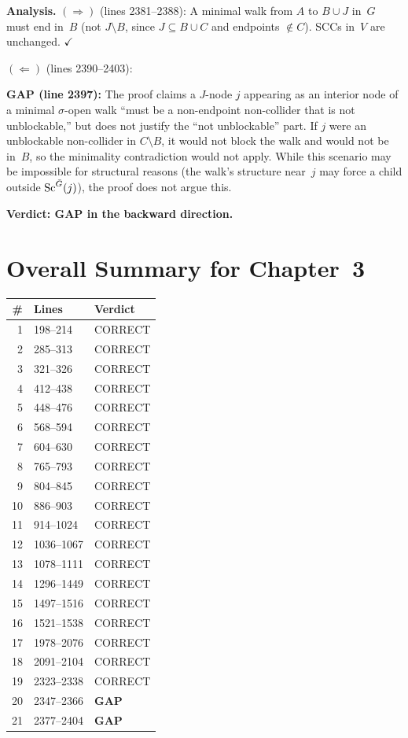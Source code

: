 \documentclass{article}
\begin{document}
\textbf{Analysis.}
$(\Rightarrow)$ (lines 2381--2388): A minimal walk from $A$ to $B\cup J$ in~$G$
must end in~$B$ (not $J\setminus B$, since $J\subseteq B\cup C$ and endpoints
$\notin C$).  SCCs in~$V$ are unchanged.  $\checkmark$

$(\Leftarrow)$ (lines 2390--2403):

\textbf{GAP (line 2397):}
The proof claims a $J$-node $j$ appearing as an interior node of a minimal
$\sigma$-open walk ``must be a non-endpoint non-collider that is not unblockable,''
but does not justify the ``not unblockable'' part.
If $j$ were an unblockable non-collider in $C\setminus B$, it would not block the
walk and would not be in~$B$, so the minimality contradiction would not apply.
While this scenario may be impossible for structural reasons
(the walk's structure near~$j$ may force a child outside $\mathrm{Sc}^{\bar G}(j)$),
the proof does not argue this.

\textbf{Verdict: GAP in the backward direction.}

\section*{Overall Summary for Chapter~3}

\begin{center}
\begin{tabular}{r|l|l}
\textbf{\#} & \textbf{Lines} & \textbf{Verdict} \\ \hline
1 & 198--214 & CORRECT \\
2 & 285--313 & CORRECT \\
3 & 321--326 & CORRECT \\
4 & 412--438 & CORRECT \\
5 & 448--476 & CORRECT \\
6 & 568--594 & CORRECT \\
7 & 604--630 & CORRECT \\
8 & 765--793 & CORRECT \\
9 & 804--845 & CORRECT \\
10 & 886--903 & CORRECT \\
11 & 914--1024 & CORRECT \\
12 & 1036--1067 & CORRECT \\
13 & 1078--1111 & CORRECT \\
14 & 1296--1449 & CORRECT \\
15 & 1497--1516 & CORRECT \\
16 & 1521--1538 & CORRECT \\
17 & 1978--2076 & CORRECT \\
18 & 2091--2104 & CORRECT \\
19 & 2323--2338 & CORRECT \\
20 & 2347--2366 & \textbf{GAP} \\
21 & 2377--2404 & \textbf{GAP} \\
\end{tabular}
\end{center}
\end{document}
